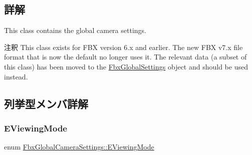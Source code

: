 \subsection{詳解}
This class contains the global camera settings.

\begin{DoxyRemark}{注釈}
This class exists for F\+BX version 6.\+x and earlier. The new F\+BX v7.\+x file format that is now the default no longer uses it. The relevant data (a subset of this class) has been moved to the \hyperlink{class_fbx_global_settings}{Fbx\+Global\+Settings} object and should be used instead. 
\end{DoxyRemark}


\subsection{列挙型メンバ詳解}
\mbox{\label{class_fbx_global_camera_settings_aaa674f8b39e4cd57d7cc07f381f11858}} 
\subsubsection{\texorpdfstring{E\+Viewing\+Mode}{EViewingMode}}
{\footnotesize\ttfamily enum \hyperlink{class_fbx_global_camera_settings_aaa674f8b39e4cd57d7cc07f381f11858}{Fbx\+Global\+Camera\+Settings\+::\+E\+Viewing\+Mode}}

